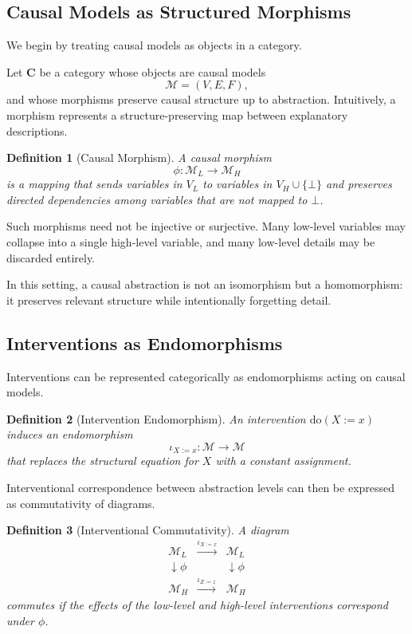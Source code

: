 \documentclass[11pt]{article}
\newtheorem{definition}{Definition}
\begin{document}
\subsection{Causal Models as Structured Morphisms}

We begin by treating causal models as objects in a category.

Let $\mathbf{C}$ be a category whose objects are causal models
\[
\mathcal{M} = (V, E, F),
\]
and whose morphisms preserve causal structure up to abstraction. Intuitively, a morphism represents a structure-preserving map between explanatory descriptions.

\begin{definition}[Causal Morphism]
A causal morphism
\[
\phi : \mathcal{M}_L \rightarrow \mathcal{M}_H
\]
is a mapping that sends variables in $V_L$ to variables in $V_H \cup \{\bot\}$ and preserves directed dependencies among variables that are not mapped to $\bot$.
\end{definition}

Such morphisms need not be injective or surjective. Many low-level variables may collapse into a single high-level variable, and many low-level details may be discarded entirely.

In this setting, a causal abstraction is not an isomorphism but a homomorphism: it preserves relevant structure while intentionally forgetting detail.

\subsection{Interventions as Endomorphisms}

Interventions can be represented categorically as endomorphisms acting on causal models.

\begin{definition}[Intervention Endomorphism]
An intervention $\mathrm{do}(X := x)$ induces an endomorphism
\[
\iota_{X := x} : \mathcal{M} \rightarrow \mathcal{M}
\]
that replaces the structural equation for $X$ with a constant assignment.
\end{definition}

Interventional correspondence between abstraction levels can then be expressed as commutativity of diagrams.

\begin{definition}[Interventional Commutativity]
A diagram
\[
\begin{array}{ccc}
\mathcal{M}_L & \xrightarrow{\iota_{X := x}} & \mathcal{M}_L \\
\downarrow \phi &  & \downarrow \phi \\
\mathcal{M}_H & \xrightarrow{\iota_{Z := z}} & \mathcal{M}_H
\end{array}
\]
commutes if the effects of the low-level and high-level interventions correspond under $\phi$.
\end{definition}
\end{document}
